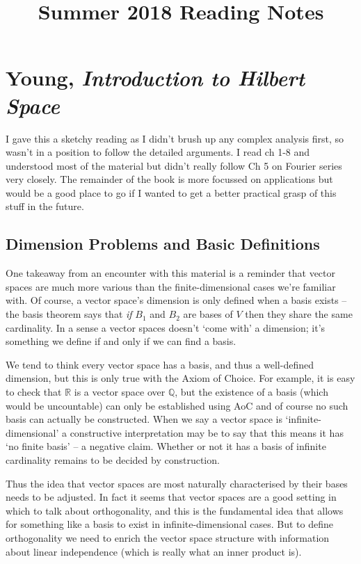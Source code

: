\documentclass[oneside,english]{amsbook}
\numberwithin{section}{chapter}
\theoremstyle{plain}
\theoremstyle{definition}
\begin{document}
\title{Summer 2018 Reading Notes}

\maketitle

\tableofcontents

\chapter{Young, \emph{Introduction to Hilbert Space}}

I gave this a sketchy reading as I didn't brush up any complex analysis first, so wasn't in a position to follow the detailed arguments. I read ch 1-8 and understood most of the material but didn't really follow Ch 5 on Fourier series very closely. The remainder of the book is more focussed on applications but would be a good place to go if I wanted to get a better practical grasp of this stuff in the future.

\section{Dimension Problems and Basic Definitions}

One takeaway from an encounter with this material is a reminder that vector spaces are much more various than the finite-dimensional cases we're familiar with. Of course, a vector space's dimension is only defined when a basis exists -- the basis theorem says that \emph{if} $B_1$ and $B_2$ are bases of $V$ then they share the same cardinality. In a sense a vector spaces doesn't `come with' a dimension; it's something we define if and only if we can find a basis.

We tend to think every vector space has a basis, and thus a well-defined dimension, but this is only true with the Axiom of Choice. For example, it is easy to check that $\mathbb{R}$ is a vector space over $\mathbb{Q}$, but the existence of a basis (which would be uncountable) can only be established using AoC and of course no such basis can actually be constructed. When we say a vector space is `infinite-dimensional' a constructive interpretation may be to say that this means it has `no finite basis' -- a negative claim. Whether or not it has a basis of infinite cardinality remains to be decided by construction.

Thus the idea that vector spaces are most naturally characterised by their bases needs to be adjusted. In fact it seems that vector spaces are a good setting in which to talk about orthogonality, and this is the fundamental idea that allows for something like a basis to exist in infinite-dimensional cases. But to define orthogonality we need to enrich the vector space structure with information about linear independence (which is really what an inner product is).
\end{document}
